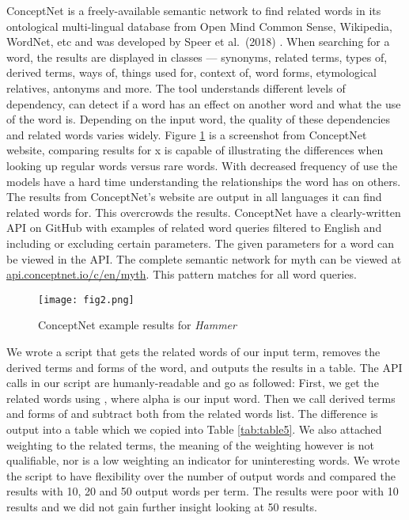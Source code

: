 \documentclass[12pt, usenames, dvipsnames]{report}
\begin{document}
\begin{flushleft}
ConceptNet is a freely-available semantic network to find related words in its ontological multi-lingual database from Open Mind Common Sense, Wikipedia, WordNet, etc and was developed by Speer et al.\ (2018) \cite{speer2018}.
When searching for a word, the results are displayed in classes --- synonyms, related terms, types of, derived terms, ways of, things used for, context of, word forms, etymological relatives, antonyms and more.
The tool understands different levels of dependency, can detect if a word has an effect on another word and what the use of the word is.
Depending on the input word, the quality of these dependencies and related words varies widely.
Figure \ref{fig:figure2} is a screenshot from ConceptNet website, comparing results for x is capable of illustrating the differences when looking up regular words versus rare words.
With decreased frequency of use the models have a hard time understanding the relationships the word has on others.
The results from ConceptNet’s website are output in all languages it can find related words for.
This overcrowds the results.
ConceptNet have a clearly-written API on GitHub with examples of related word queries filtered to English and including or excluding certain parameters.
The given parameters for a word can be viewed in the API.
The complete semantic network for myth can be viewed at \url{api.conceptnet.io/c/en/myth}.
This pattern matches for all word queries.

\vspace*{0.2em}
\begin{figure}[!htbp]
  \hspace*{11em}
  \texttt{[image: fig2.png]}
  \caption{ConceptNet example results for \emph{Hammer}}
  \label{fig:figure2}
\end{figure}
\vspace*{0.2em}

We wrote a script that gets the related words of our input term, removes the derived terms and forms of the word, and outputs the results in a table.
The API calls in our script are humanly-readable and go as followed:
First, we get the related words using , where alpha is our input word.
Then we call derived terms  and forms of  and subtract both from the related words list.
The difference is output into a table which we copied into Table \ref{tab:table5}.
We also attached weighting to the related terms, the meaning of the weighting however is not qualifiable, nor is a low weighting an indicator for uninteresting words.
We wrote the script to have flexibility over the number of output words and compared the results with 10, 20 and 50 output words per term.
The results were poor with 10 results and we did not gain further insight looking at 50 results.


\end{flushleft}
\end{document}
